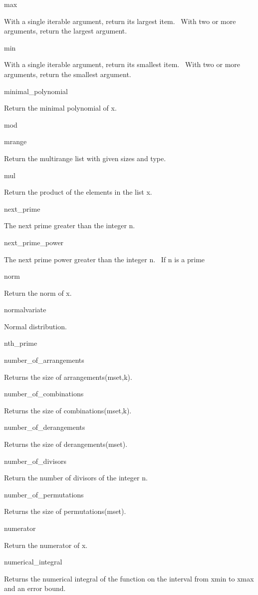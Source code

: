 \documentclass[12pt,twoside]{book}
\begin{document}
max

With a single iterable argument, return its largest item. \ With two or
more arguments, return the largest argument.

min

With a single iterable argument, return its smallest item. \ With two or
more arguments, return the smallest argument.

minimal\_polynomial

Return the minimal polynomial of x.

mod


\bigskip

mrange

Return the multirange list with given sizes and type.

mul

Return the product of the elements in the list x.

next\_prime

The next prime greater than the integer n.

next\_prime\_power

The next prime power greater than the integer n. \ If n is a prime

norm

Return the norm of x.

normalvariate

Normal distribution.

nth\_prime


\bigskip

number\_of\_arrangements

Returns the size of arrangements(mset,k).

number\_of\_combinations

Returns the size of combinations(mset,k).

number\_of\_derangements

Returns the size of derangements(mset).

number\_of\_divisors

Return the number of divisors of the integer n.

number\_of\_permutations

Returns the size of permutations(mset).

numerator

Return the numerator of x.

numerical\_integral

Returns the numerical integral of the function on the interval from xmin
to xmax and an error bound.
\end{document}
